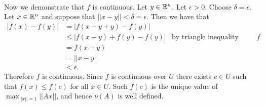\documentclass[letterpaper,12pt,oneside,onecolumn]{article}
\begin{document}
\paragraph{}
Now we demonstrate that $f$ is continuous. Let $y \in \mathbb{R}^n$. Let $\epsilon > 0 $. Choose $\delta = \epsilon$. Let $x \in \mathbb{R}^n$ and suppose that $||x - y|| < \delta = \epsilon$. Then we have that
\begin{align*}
|f(x) - f(y)| &= |f(x - y + y) - f(y)| \\
&\leq |f(x-y) + f(y) -f(y)| &\text{by triangle inequality applied to $f$}\\
&= f(x-y) \\
&= ||x-y|| \\
&< \epsilon.
\end{align*}
Therefore $f$ is continuous. Since $f$ is continuous over $U$ there exists $c \in U$ such that $f(x) \leq f(c)$ for all $x \in U$. Such $f(c)$ is the unique value of $\max_{||x|| =1} ||Ax||$, and hence $\nu(A)$ is well defined.
\end{document}
